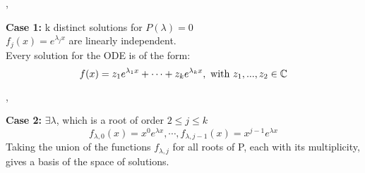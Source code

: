 \sep

\textbf{Case 1:} k distinct solutions for $P(\lambda) = 0$ \\
$f_j(x) = e^{\lambda_j x}$ are linearly independent. \\

Every solution for the ODE is of the form:
\[ f(x) = z_1 e^{\lambda_1 x} + \cdots + z_k e^{\lambda_k x}, \text{ with }  z_1, ..., z_2 \in \mathbb{C}\]

\sep

\textbf{Case 2:} $\exists \lambda$, which is a root of order $2 \leq j \leq k$
\[ f_{\lambda, 0}(x) = x^0 e^{\lambda x}, \cdots, f_{\lambda, j - 1}(x) = x^{j - 1}  e^{\lambda x}\]
Taking the union of the functions $f_{\lambda, j}$ for all roots of P, each with its multiplicity, gives a basis of the space of solutions. 